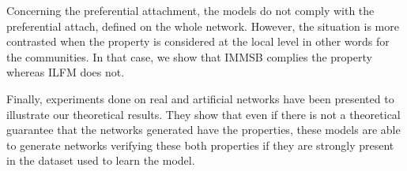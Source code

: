 \documentclass[9pt,twocolumn,twoside]{pnas-new}
\begin{document}
Concerning the preferential attachment, the models do not comply with the preferential attach, defined on the whole network. However, the situation is more contrasted when the property is considered at the local level in other words for the communities. In that case, we show that IMMSB complies the property whereas ILFM does not.

Finally, experiments done on real and artificial networks have been presented to illustrate our theoretical results. They show that even if there is not a theoretical guarantee that the networks generated  have the  properties, these models are able to generate networks verifying these both properties if they are  strongly present in the dataset used to learn the model.




\end{document}
